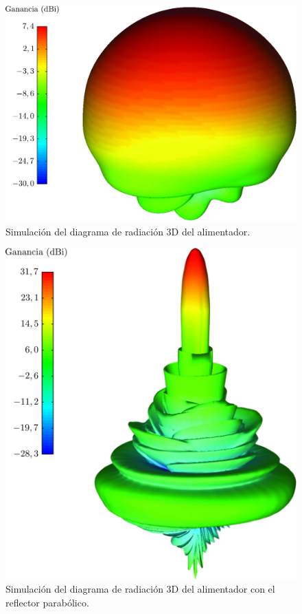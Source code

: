 \begin{figure}[H]
\centering
\includegraphics[scale = 0.25]{Figures/Resultados/resultados_28}
\caption{Simulación del diagrama de radiación 3D del alimentador.}
\label{fig_resultados:28}
\end{figure}
\begin{figure}[H]
\centering
\includegraphics[scale = 0.25]{Figures/Resultados/resultados_29}
\caption{Simulación del diagrama de radiación 3D del alimentador con el reflector parabólico.}
\label{fig_resultados:29}
\end{figure}
